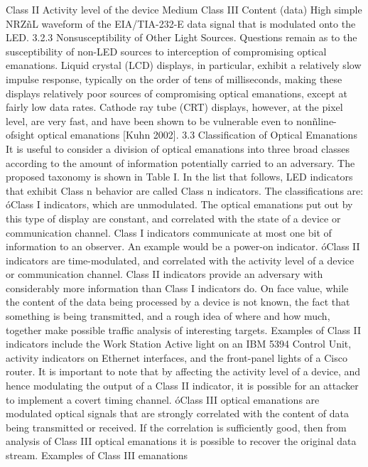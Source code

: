 Class II Activity level of the device Medium 
Class III Content (data) High 
simple NRZñL waveform of the EIA/TIA-232-E data signal that is modulated 
onto the LED. 
3.2.3 Nonsusceptibility of Other Light Sources. Questions remain as to the 
susceptibility of non-LED sources to interception of compromising optical emanations. 
Liquid crystal (LCD) displays, in particular, exhibit a relatively slow 
impulse response, typically on the order of tens of milliseconds, making these 
displays relatively poor sources of compromising optical emanations, except at 
fairly low data rates. Cathode ray tube (CRT) displays, however, at the pixel 
level, are very fast, and have been shown to be vulnerable even to nonñline-ofsight 
optical emanations [Kuhn 2002]. 
3.3 Classification of Optical Emanations 
It is useful to consider a division of optical emanations into three broad classes 
according to the amount of information potentially carried to an adversary. The 
proposed taxonomy is shown in Table I. In the list that follows, LED indicators 
that exhibit Class n behavior are called Class n indicators. 
The classifications are: 
óClass I indicators, which are unmodulated. The optical emanations put out 
by this type of display are constant, and correlated with the state of a device 
or communication channel. Class I indicators communicate at most one bit 
of information to an observer. An example would be a power-on indicator. 
óClass II indicators are time-modulated, and correlated with the activity level 
of a device or communication channel. Class II indicators provide an adversary 
with considerably more information than Class I indicators do. On face 
value, while the content of the data being processed by a device is not known, 
the fact that something is being transmitted, and a rough idea of where and 
how much, together make possible traffic analysis of interesting targets. Examples 
of Class II indicators include the Work Station Active light on an 
IBM 5394 Control Unit, activity indicators on Ethernet interfaces, and the 
front-panel lights of a Cisco router. It is important to note that by affecting 
the activity level of a device, and hence modulating the output of a Class II 
indicator, it is possible for an attacker to implement a covert timing channel. 
óClass III optical emanations are modulated optical signals that are strongly 
correlated with the content of data being transmitted or received. If the correlation 
is sufficiently good, then from analysis of Class III optical emanations 
it is possible to recover the original data stream. Examples of Class III emanations 
